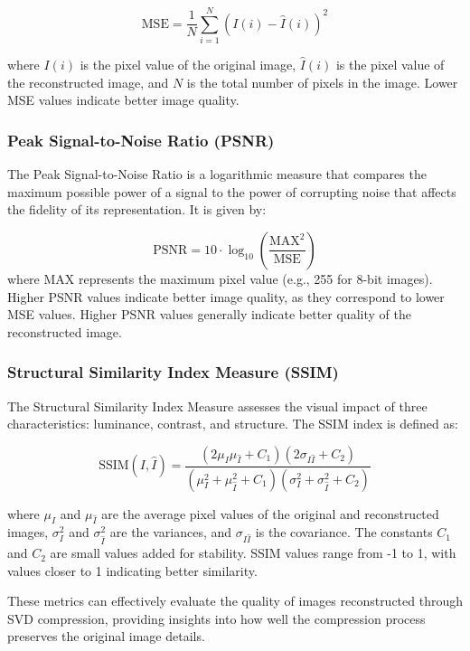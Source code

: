 \documentclass[
  journal,
]{IEEEtran}%
\begin{document}
\[
\text{MSE} = \frac{1}{N} \sum_{i=1}^{N} (I(i) - \hat{I}(i))^2
\]

where \(I(i)\) is the pixel value of the original image, \(\hat{I}(i)\)
is the pixel value of the reconstructed image, and \(N\) is the total
number of pixels in the image. Lower MSE values indicate better image
quality.

\subsubsection{Peak Signal-to-Noise Ratio
(PSNR)}\label{peak-signal-to-noise-ratio-psnr}

The Peak Signal-to-Noise Ratio is a logarithmic measure that compares
the maximum possible power of a signal to the power of corrupting noise
that affects the fidelity of its representation. It is given by:

\[
\text{PSNR} = 10 \cdot \log_{10} \left( \frac{\text{MAX}^2}{\text{MSE}} \right)
\] where \(\text{MAX}\) represents the maximum pixel value (e.g., 255
for 8-bit images). Higher PSNR values indicate better image quality, as
they correspond to lower MSE values. Higher PSNR values generally
indicate better quality of the reconstructed image.

\subsubsection{Structural Similarity Index Measure
(SSIM)}\label{structural-similarity-index-measure-ssim}

The Structural Similarity Index Measure assesses the visual impact of
three characteristics: luminance, contrast, and structure. The SSIM
index is defined as:

\[
\text{SSIM}(I, \hat{I}) = \frac{(2\mu_I \mu_{\hat{I}} + C_1)(2\sigma_{I\hat{I}} + C_2)}{(\mu_I^2 + \mu_{\hat{I}}^2 + C_1)(\sigma_I^2 + \sigma_{\hat{I}}^2 + C_2)}
\]

where \(\mu_I\) and \(\mu_{\hat{I}}\) are the average pixel values of
the original and reconstructed images, \(\sigma_I^2\) and
\(\sigma_{\hat{I}}^2\) are the variances, and \(\sigma_{I\hat{I}}\) is
the covariance. The constants \(C_1\) and \(C_2\) are small values added
for stability. SSIM values range from -1 to 1, with values closer to 1
indicating better similarity.

These metrics can effectively evaluate the quality of images
reconstructed through SVD compression, providing insights into how well
the compression process preserves the original image details.
\end{document}
